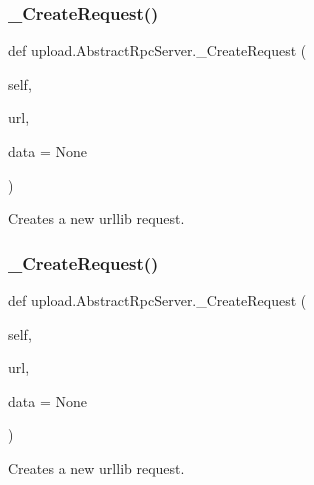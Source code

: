 \subsubsection{\texorpdfstring{\_CreateRequest()}{\_CreateRequest()}\hspace{0.1cm}{\footnotesize\ttfamily [1/2]}}
{\footnotesize\ttfamily def upload.\+Abstract\+Rpc\+Server.\+\_\+\+Create\+Request (\begin{DoxyParamCaption}\item[{}]{self,  }\item[{}]{url,  }\item[{}]{data = {\ttfamily None} }\end{DoxyParamCaption})\hspace{0.3cm}{\ttfamily [private]}}

\begin{DoxyVerb}Creates a new urllib request.\end{DoxyVerb}
 \mbox{\label{classupload_1_1_abstract_rpc_server_a1553c79619eec0770932cd4fa325243c}} 
\subsubsection{\texorpdfstring{\_CreateRequest()}{\_CreateRequest()}\hspace{0.1cm}{\footnotesize\ttfamily [2/2]}}
{\footnotesize\ttfamily def upload.\+Abstract\+Rpc\+Server.\+\_\+\+Create\+Request (\begin{DoxyParamCaption}\item[{}]{self,  }\item[{}]{url,  }\item[{}]{data = {\ttfamily None} }\end{DoxyParamCaption})\hspace{0.3cm}{\ttfamily [private]}}

\begin{DoxyVerb}Creates a new urllib request.\end{DoxyVerb}
 \mbox{\label{classupload_1_1_abstract_rpc_server_a45ba7a36fd840608f532694be6b6a9ae}} 
